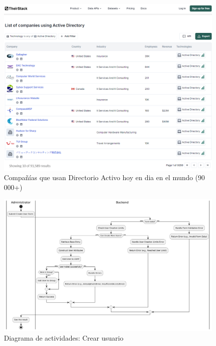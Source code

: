 \newpage
{}
\begin{landscape}
    \begin{figure}
        \centering
        \includegraphics[width=\linewidth]{images/companies using ad - 2 .png}
        \caption{Compañías que usan Directorio Activo hoy en dia en el mundo (90 000+)}
        \label{fig:companies-using-ad}
    \end{figure}

    \begin{figure}[h]
        \centering
        \includegraphics[scale=0.55]{images/puml/activity-diagram-create-user/activity-diagram create user.png}
        \caption{Diagrama de actividades: Crear usuario}
        \label{fig:activity-diagram-create-user}
    \end{figure}
\end{landscape}
\restoregeometry


